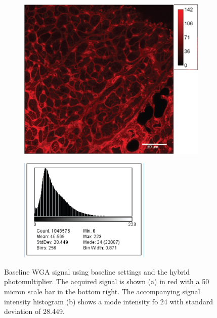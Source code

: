 \documentclass[12pt]{article}
\begin{document}
\begin{figure}
	\begin{subfigure}{.5\textwidth}
		\centering
		\includegraphics[width=.95\linewidth]{FinalFigures/WGA_Baseline.png}
		\caption{}
		\label{fig:wga_b}
	\end{subfigure}%
	\begin{subfigure}{.5\textwidth}
		\centering
		\includegraphics[width=.95\linewidth]{FinalFigures/WGA_Baseline_Hist.png}
		\caption{}
		\label{fig:wga_b_hist}
	\end{subfigure}
	\caption{Baseline WGA signal using baseline settings and the hybrid photomultiplier. The acquired signal is shown (a) in red with a 50 micron scale bar in the bottom right. The accompanying signal intensity histogram (b) shows a mode intensity fo 24 with standard deviation of 28.449.}
	\label{fig:wga_base}
\end{figure}
\end{document}
